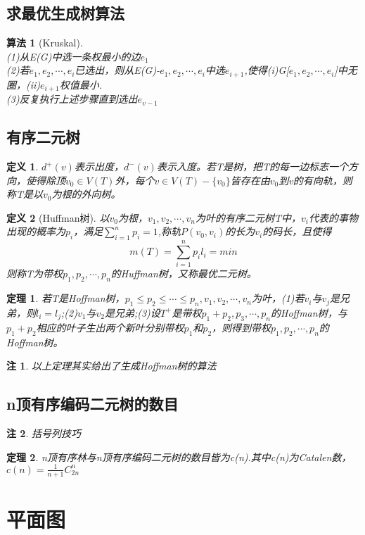 \documentclass[UTF8]{ctexart}
\newtheorem{dfnt}{定义}
\newtheorem{thr}{定理}
\newtheorem*{note}{注}
\newtheorem{alg}{算法}
\begin{document}
\subsection{求最优生成树算法}
\begin{alg}[Kruskal]
\quad \\(1)从E(G)中选一条权最小的边$e_1$\\(2)若$e_1,e_2,\cdots,e_i$已选出，则从E(G)-{$e_1,e_2,\cdots,e_i$}中选$e_{i+1}$,使得(i)G[{$e_1,e_2,\cdots,e_i$}]中无圈，(ii)$e_{i+1}$权值最小.\\(3)反复执行上述步骤直到选出$e_{v-1}$
\end{alg}
\subsection{有序二元树}
\begin{dfnt}
$d^+(v)$表示出度，$d^-(v)$表示入度。若T是树，把T的每一边标志一个方向，使得除顶$v_0 \in V(T)$外，每个$v \in V(T)-\{v_0\}$皆存在由$v_0$到v的有向轨，则称T是以$v_0$为根的外向树。
\end{dfnt}
\begin{dfnt}[Huffman树]
以$v_0$为根，$v_1,v_2,\cdots,v_n$为叶的有序二元树T中，$v_i$代表的事物出现的概率为$p_i$，满足$\sum \limits_{i=1}^{n} p_i = 1$,称轨$P(v_0,v_i)$的长为$v_i$的码长，且使得$$m(T)=\sum \limits_{i=1}^n p_i l_i = min$$则称T为带权$p_1,p_2,\cdots,p_n$的Huffman树，又称最优二元树。
\end{dfnt}
\begin{thr}
若T是Hoffman树，$p_1 \leq p_2 \leq \cdots \leq p_n,v_1,v_2,\cdots,v_n$为叶，(1)若$v_i$与$v_j$是兄弟，则$l_i=l_j$;(2)$v_1$与$v_2$是兄弟;(3)设$T^+$是带权$p_1+p_2,p_3,\cdots,p_n$的Hoffman树，与$p_1+p_2$相应的叶子生出两个新叶分别带权$p_1$和$p_2$，则得到带权$p_1,p_2,\cdots,p_n$的Hoffman树。
\end{thr}
\begin{note}
以上定理其实给出了生成Hoffman树的算法
\end{note}
\subsection{n顶有序编码二元树的数目}
\begin{note}
括号列技巧
\end{note}
\begin{thr}
n顶有序林与n顶有序编码二元树的数目皆为c(n).其中c(n)为Catalen数，$c(n)= \frac{1}{n+1}C_{2n}^{n}$
\end{thr}
\section{平面图}
\end{document}

